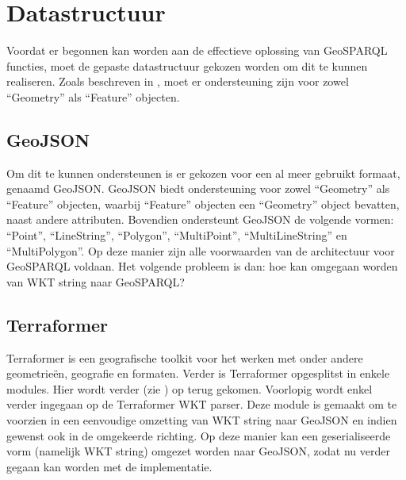 \section{Datastructuur}
\label{sec:datastructuur}
Voordat er begonnen kan worden aan de effectieve oplossing van GeoSPARQL functies, moet de gepaste datastructuur gekozen worden om dit te kunnen realiseren. Zoals beschreven in , moet er ondersteuning zijn voor zowel ``Geometry'' als ``Feature'' objecten. 

\subsection{GeoJSON}
Om dit te kunnen ondersteunen is er gekozen voor een al meer gebruikt formaat, genaamd GeoJSON. GeoJSON biedt ondersteuning voor zowel ``Geometry'' als ``Feature'' objecten, waarbij ``Feature'' objecten een ``Geometry'' object bevatten, naast andere attributen. Bovendien ondersteunt GeoJSON de volgende vormen: ``Point'', ``LineString'', ``Polygon'', ``MultiPoint'', ``MultiLineString'' en ``MultiPolygon''. Op deze manier zijn alle voorwaarden van de architectuur voor GeoSPARQL voldaan. Het volgende probleem is dan: hoe kan omgegaan worden van WKT string naar GeoSPARQL?

\subsection{Terraformer}
Terraformer is een geografische toolkit voor het werken met onder andere geometrieën, geografie en formaten. Verder is Terraformer opgesplitst in enkele modules. Hier wordt verder (zie ) op terug gekomen. Voorlopig wordt enkel verder ingegaan op de Terraformer WKT parser. Deze module is gemaakt om te voorzien in een eenvoudige omzetting van WKT string naar GeoJSON en indien gewenst ook in de omgekeerde richting. Op deze manier kan een geserialiseerde vorm (namelijk WKT string) omgezet worden naar GeoJSON, zodat nu verder gegaan kan worden met de implementatie. 



